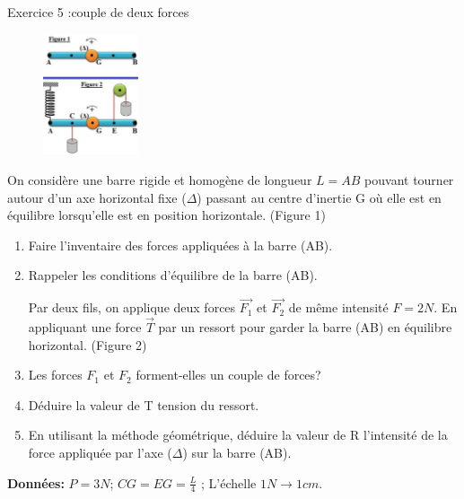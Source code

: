 \documentclass[12pt, french]{article}
\begin{document}
\begin{Box2}{Exercice 5 :couple de deux forces  }
	\begin{figure}
  \begin{center}
	\includegraphics[width=0.25\textwidth]{./img/ex04.png}
  \end{center}
\end{figure}

On considère une barre rigide et homogène de longueur $L = AB$
pouvant tourner autour d'un axe horizontal fixe ($\Delta$) passant au
centre d'inertie G où elle est en équilibre lorsqu’elle est en
position horizontale. (Figure 1)

\begin{enumerate}
\item Faire l’inventaire des forces appliquées à la barre (AB).
\item  Rappeler les conditions d’équilibre de la barre (AB).

	Par deux fils, on applique deux forces $\vec{F_1}$ et $\vec{F_2}$ de même intensité
	$F=2N$. En appliquant une force $\vec{T}$ par un ressort pour garder la
barre (AB) en équilibre horizontal. (Figure 2)

\item  Les forces $F_1$ et $F_2$ forment-elles un couple de forces?

\item  Déduire la valeur de T tension du ressort.
\item  En utilisant la méthode géométrique, déduire la valeur de R
l'intensité de la force appliquée par l'axe ($\Delta$) sur la barre (AB).
\end{enumerate}

\textbf{Données:} $P = 3N$; $CG = EG = \frac{L}{4}$ ; L'échelle $1N \rightarrow 1cm$.


\end{Box2}
\end{document}
